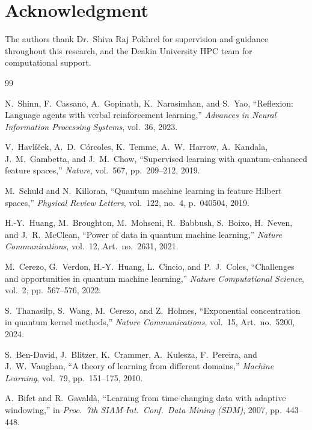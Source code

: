 \documentclass[conference]{IEEEtran}
\begin{document}
\section*{Acknowledgment}

The authors thank Dr.\ Shiva Raj Pokhrel for supervision and guidance
throughout this research, and the Deakin University HPC team for
computational support.

\begin{thebibliography}{99}

N.~Shinn, F.~Cassano, A.~Gopinath, K.~Narasimhan, and S.~Yao,
``Reflexion: Language agents with verbal reinforcement learning,''
\textit{Advances in Neural Information Processing Systems}, vol.~36, 2023.

V.~Havl\'{i}\v{c}ek, A.~D.~C\'{o}rcoles, K.~Temme, A.~W.~Harrow,
A.~Kandala, J.~M.~Gambetta, and J.~M.~Chow,
``Supervised learning with quantum-enhanced feature spaces,''
\textit{Nature}, vol.~567, pp.~209--212, 2019.

M.~Schuld and N.~Killoran,
``Quantum machine learning in feature Hilbert spaces,''
\textit{Physical Review Letters}, vol.~122, no.~4, p.~040504, 2019.

H.-Y.~Huang, M.~Broughton, M.~Mohseni, R.~Babbush, S.~Boixo, H.~Neven,
and J.~R.~McClean,
``Power of data in quantum machine learning,''
\textit{Nature Communications}, vol.~12, Art.\ no.~2631, 2021.

M.~Cerezo, G.~Verdon, H.-Y.~Huang, L.~Cincio, and P.~J.~Coles,
``Challenges and opportunities in quantum machine learning,''
\textit{Nature Computational Science}, vol.~2, pp.~567--576, 2022.

S.~Thanasilp, S.~Wang, M.~Cerezo, and Z.~Holmes,
``Exponential concentration in quantum kernel methods,''
\textit{Nature Communications}, vol.~15, Art.\ no.~5200, 2024.

S.~Ben-David, J.~Blitzer, K.~Crammer, A.~Kulesza, F.~Pereira, and
J.~W.~Vaughan,
``A theory of learning from different domains,''
\textit{Machine Learning}, vol.~79, pp.~151--175, 2010.

A.~Bifet and R.~Gavald\`{a},
``Learning from time-changing data with adaptive windowing,''
in \textit{Proc.\ 7th SIAM Int.\ Conf.\ Data Mining (SDM)}, 2007,
pp.~443--448.


\end{thebibliography}
\end{document}
